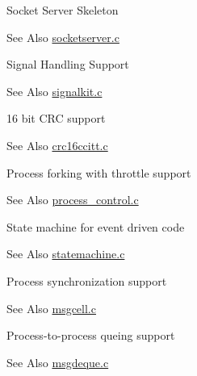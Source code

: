 \begin{DoxyItemize}
\begin{DoxyItemize}
\item Socket Server Skeleton \begin{DoxySeeAlso}{See Also}
\hyperlink{socketserver_8c}{socketserver.\-c} 
\end{DoxySeeAlso}

\item Signal Handling Support \begin{DoxySeeAlso}{See Also}
\hyperlink{signalkit_8c}{signalkit.\-c} 
\end{DoxySeeAlso}

\item 16 bit C\-R\-C support \begin{DoxySeeAlso}{See Also}
\hyperlink{crc16ccitt_8c}{crc16ccitt.\-c}  
\end{DoxySeeAlso}

\item Process forking with throttle support \begin{DoxySeeAlso}{See Also}
\hyperlink{process__control_8c}{process\-\_\-control.\-c} 
\end{DoxySeeAlso}

\item State machine for event driven code \begin{DoxySeeAlso}{See Also}
\hyperlink{statemachine_8c}{statemachine.\-c} 
\end{DoxySeeAlso}

\item Process synchronization support \begin{DoxySeeAlso}{See Also}
\hyperlink{msgcell_8c}{msgcell.\-c} 
\end{DoxySeeAlso}

\item Process-\/to-\/process queing support \begin{DoxySeeAlso}{See Also}
\hyperlink{msgdeque_8c}{msgdeque.\-c} 
\end{DoxySeeAlso}

\end{DoxyItemize}
\end{DoxyItemize}